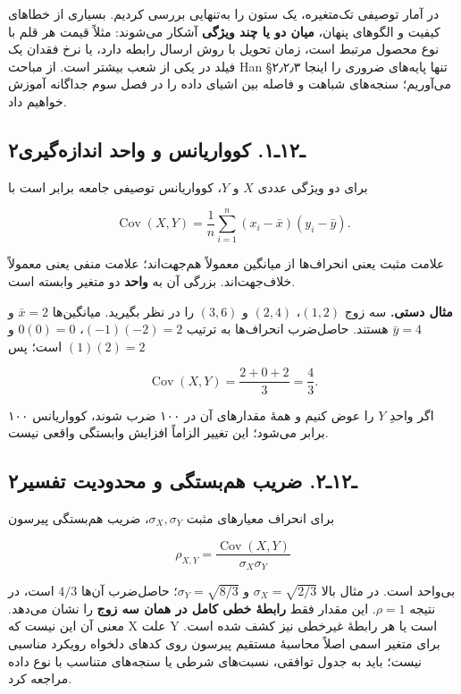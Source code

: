 \documentclass[12pt,a4paper,oneside]{book}
\begin{document}
در آمار توصیفی تک‌متغیره، یک ستون را به‌تنهایی بررسی کردیم. بسیاری از خطاهای کیفیت و الگوهای پنهان، \textbf{میان دو یا چند ویژگی} آشکار می‌شوند: مثلاً قیمت هر قلم با نوع محصول مرتبط است، زمان تحویل با روش ارسال رابطه دارد، یا نرخ فقدان یک فیلد در یکی از شعب بیشتر است. از مباحث Han §۲٫۲٫۳ تنها پایه‌های ضروری را اینجا می‌آوریم؛ سنجه‌های شباهت و فاصله بین اشیای داده را در فصل سوم جداگانه آموزش خواهیم داد.

\subsection{۲ـ۱۲ـ۱. کوواریانس و واحد اندازه‌گیری}\label{ux640ux6f1ux6f2ux640ux6f1.-ux6a9ux648ux648ux627ux631ux6ccux627ux646ux633-ux648-ux648ux627ux62dux62f-ux627ux646ux62fux627ux632ux647ux6afux6ccux631ux6cc}

برای دو ویژگی عددی \(X\) و \(Y\)، کوواریانس توصیفی جامعه برابر است با

\[
\operatorname{Cov}(X,Y)=\frac1n\sum_{i=1}^n(x_i-\bar x)(y_i-\bar y).
\]

علامت مثبت یعنی انحراف‌ها از میانگین معمولاً هم‌جهت‌اند؛ علامت منفی یعنی معمولاً خلاف‌جهت‌اند. بزرگی آن به \textbf{واحد} دو متغیر وابسته است.

\textbf{مثال دستی.} سه زوج \((1,2)\)، \((2,4)\) و \((3,6)\) را در نظر بگیرید. میانگین‌ها \(\bar x=2\) و \(\bar y=4\) هستند. حاصل‌ضرب انحراف‌ها به ترتیب \((-1)(-2)=2\)، \(0(0)=0\) و \((1)(2)=2\) است؛ پس

\[
\operatorname{Cov}(X,Y)=\frac{2+0+2}{3}=\frac43.
\]

اگر واحدِ \(Y\) را عوض کنیم و همهٔ مقدارهای آن در ۱۰۰ ضرب شوند، کوواریانس ۱۰۰ برابر می‌شود؛ این تغییر الزاماً افزایش وابستگی واقعی نیست.

\subsection{۲ـ۱۲ـ۲. ضریب هم‌بستگی و محدودیت تفسیر}\label{ux640ux6f1ux6f2ux640ux6f2.-ux636ux631ux6ccux628-ux647ux645ux628ux633ux62aux6afux6cc-ux648-ux645ux62dux62fux648ux62fux6ccux62a-ux62aux641ux633ux6ccux631}

برای انحراف معیارهای مثبت \(\sigma_X,\sigma_Y\)، ضریب هم‌بستگی پیرسون

\[
\rho_{X,Y}=\frac{\operatorname{Cov}(X,Y)}{\sigma_X\sigma_Y}
\]

بی‌واحد است. در مثال بالا \(\sigma_X=\sqrt{2/3}\) و \(\sigma_Y=\sqrt{8/3}\)؛ حاصل‌ضرب آن‌ها \(4/3\) است، در نتیجه \(\rho=1\). این مقدار فقط \textbf{رابطهٔ خطی کامل در همان سه زوج} را نشان می‌دهد. معنی آن این نیست که X علت Y است یا هر رابطهٔ غیرخطی نیز کشف شده است. برای متغیر اسمی اصلاً محاسبهٔ مستقیم پیرسون روی کدهای دلخواه رویکرد مناسبی نیست؛ باید به جدول توافقی، نسبت‌های شرطی یا سنجه‌های متناسب با نوع داده مراجعه کرد.
\end{document}
